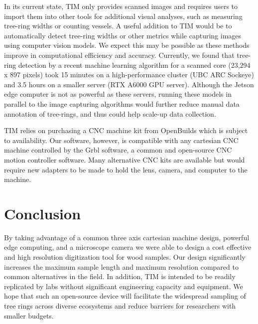 \documentclass[a4paper,12pt]{article}
\begin{document}
In its current state, TIM only provides scanned images and requires users to import them into other tools for additional visual analyses, such as measuring tree-ring widths or counting vessels.
A useful addition to TIM would be to automatically detect tree-ring widths or other metrics while capturing images using computer vision models. We expect this may be possible as these methods improve in computational efficiency and accuracy. Currently, we found that tree-ring detection by a recent machine learning algorithm  \citep[R-CNN presented by][]{polacek_automation_2023} for a scanned core (23,294 x 897 pixels) took 15 minutes on a high-performance cluster (UBC ARC Sockeye) and 3.5 hours on a smaller server (RTX A6000 GPU server). 
Although the Jetson edge computer is not as powerful as these servers, running these models in parallel to the image capturing algorithms would further reduce manual data annotation of tree-rings, and thus could help scale-up data collection.

TIM relies on purchasing a CNC machine kit from OpenBuilds which is subject to availability. Our software, however, is compatible with any cartesian CNC machine controlled by the Grbl software, a common and open-source CNC motion controller software.
Many alternative CNC kits are available but would require new adapters to be made to hold the lens, camera, and computer to the machine.

\section{Conclusion}  
By taking advantage of a common three axis cartesian machine design, powerful edge computing, and a microscope camera we were able to design a cost effective and high resolution digitization tool for wood samples. 
Our design significantly increases the maximum sample length and maximum resolution compared to common alternatives in the field. 
In addition, TIM is intended to be readily replicated by labs without significant engineering capacity and equipment. 
We hope that such an open-source device will facilitate the widespread sampling of tree rings across diverse ecosystems and reduce barriers for researchers with smaller budgets. 
\end{document}
